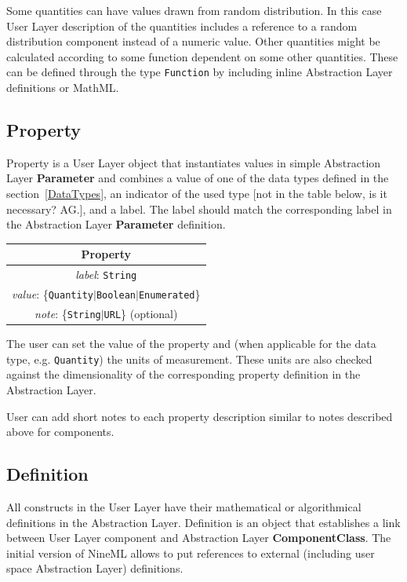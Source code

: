 \documentclass{article}
\newcommand{\ComponentClass}{{\bf{ComponentClass}}\xspace}
\newcommand{\Parameter}{{\bf{Parameter}}\xspace}
\begin{document}
Some quantities can have values drawn from random distribution. In
this case User Layer description of the quantities includes a
reference to a random distribution component instead of a numeric
value.  Other quantities might be calculated according to some
function dependent on some other quantities. These can be defined
through the type {\tt Function} by including inline Abstraction Layer
definitions or MathML.

\subsection{Property}

Property is a User Layer object that instantiates values in simple
Abstraction Layer \Parameter and combines a value of one of the data
types defined in the section~\ref{DataTypes}, an indicator of the used type
[not in the table below, is it necessary? AG.],
and a label. The label should match the corresponding label in the
Abstraction Layer \Parameter definition.

\begin{table}[htb]
\center
\begin{tabular}{|c|}
\hline
\hline
Property \\
\hline
\hline
{\em label}: {\tt String} \\
\hline
{\em value}: \{{\tt Quantity}$|${\tt Boolean}$|${\tt Enumerated}\} \\
\hline
{\em note}: \{{\tt String}$|${\tt URL}\} (optional)\\
\hline
\end{tabular}
\end{table}

The user can set the value of the property and (when applicable for the data
type, e.g. {\tt Quantity}) the units of measurement. These units are also
checked against the dimensionality of the corresponding property definition
in the Abstraction Layer.

User can add short notes to each property description similar to notes
described above for components.

\subsection{Definition}

All constructs in the User Layer have their mathematical or algorithmical
definitions in the Abstraction Layer. Definition is an object that
establishes a link between User Layer component and Abstraction Layer
\ComponentClass. The initial version of NineML allows to put references
to external (including user space Abstraction Layer) definitions.
\end{document}
